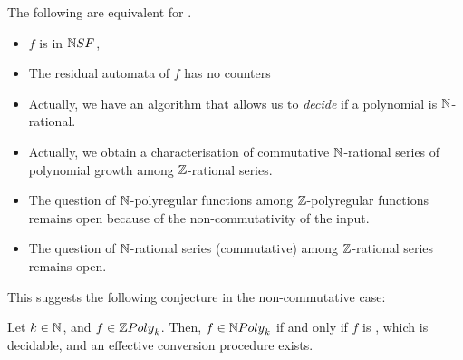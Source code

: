 \begin{theorem}
    The following are equivalent for .
    \begin{itemize}
        \item $f$ is in $\NSF$,
        \item The residual automata of $f$ has no counters
    \end{itemize}
\end{theorem}


\begin{itemize}
    \item Actually, we have an algorithm that allows
        us to \emph{decide} if a polynomial is $\mathbb{N}$-rational.
    \item Actually, we obtain a characterisation of
        commutative 
        $\mathbb{N}$-rational series of polynomial growth
        among $\mathbb{Z}$-rational series.
    \item The question of $\mathbb{N}$-polyregular functions
        among $\mathbb{Z}$-polyregular functions remains open
        because of the non-commutativity of the input.
    \item The question of $\mathbb{N}$-rational series (commutative)
        among $\mathbb{Z}$-rational series remains open.
\end{itemize}

 This suggests the
following conjecture in the non-commutative case:

\begin{conjecture}
    Let $k \in \mathbb{N}$,
    and $f \in \ZPoly[k]$. Then, $f \in \NPoly[k]$
    if and only if $f$ is , which is decidable,
    and an effective conversion procedure exists.
\end{conjecture}

